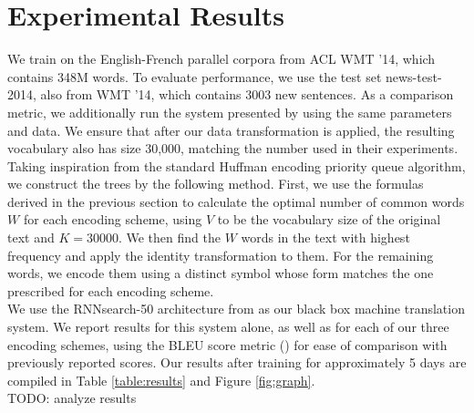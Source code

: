 \section{Experimental Results}
\label{sec:exp}

We train on the English-French parallel corpora from ACL WMT '14, which contains
348M words. To evaluate performance, we use the test set news-test-2014, also from
WMT '14, which contains 3003 new sentences. As a comparison metric, we additionally run the system presented by
 using the same parameters and data. We ensure
that after our data transformation is applied, the resulting vocabulary also has size
30,000, matching the number used in their experiments. Taking inspiration from the standard Huffman encoding
priority queue algorithm, we construct the trees by the following method. First, we use
the formulas derived in the previous section to calculate the optimal number of
common words $W$ for each encoding scheme, using $V$ to be the vocabulary size of the original text and $K = 30000$.
We then find the $W$ words in the text with highest frequency and
apply the identity transformation to them. For the remaining words, we encode them
using a distinct symbol whose form matches the one prescribed for each
encoding scheme.\\

We use the RNNsearch-50 architecture from  as
our black box machine translation system. We report results for this system alone,
as well as for each of our three encoding schemes, using the BLEU score metric () for
ease of comparison with previously reported scores. Our results after training
for approximately 5 days are compiled in Table \ref{table:results} and Figure \ref{fig:graph}.\\

TODO: analyze results\\

\begin{table}
  \centering
  \vspace{8pt}
  \caption{BLEU scores on detokenized test set for various encoding
    schemes after training for 5 days.}
  \label{table:results}
\end{table}

